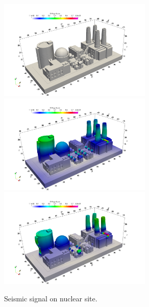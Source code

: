 \begin{figure}
    \centering
    \includegraphics[width=0.65\textwidth]{./Images/t001.png}        
    \includegraphics[width=0.65\textwidth]{./Images/t100.png}    
    \includegraphics[width=0.65\textwidth]{./Images/t199.png} 
    \caption{Seismic signal on nuclear site.}
    \label{fig:nuclearplant}
\end{figure}

